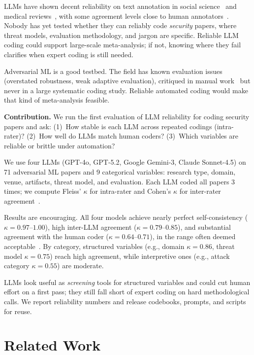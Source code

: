 \documentclass[conference,compsoc]{IEEEtran}
\begin{document}
LLMs have shown decent reliability on text annotation in social science~\cite{gilardi2023chatgpt,tornberg2024chatgpt} and medical reviews~\cite{gartlehner2025ai}, with some agreement levels close to human annotators~\cite{rathje2024gpt}. Nobody has yet tested whether they can reliably code \emph{security} papers, where threat models, evaluation methodology, and jargon are specific. Reliable LLM coding could support large-scale meta-analysis; if not, knowing where they fail clarifies when expert coding is still needed.

Adversarial ML is a good testbed. The field has known evaluation issues~\cite{carlini2017towards,athalye2018obfuscated,tramer2020adaptive,arp2022dos} (overstated robustness, weak adaptive evaluation), critiqued in manual work~\cite{carlini2019evaluating} but never in a large systematic coding study. Reliable automated coding would make that kind of meta-analysis feasible.

\textbf{Contribution.} We run the first evaluation of LLM reliability for coding security papers and ask: (1)~How stable is each LLM across repeated codings (intra-rater)? (2)~How well do LLMs match human coders? (3)~Which variables are reliable or brittle under automation?

We use four LLMs (GPT-4o, GPT-5.2, Google Gemini-3, Claude Sonnet-4.5) on 71 adversarial ML papers and 9 categorical variables: research type, domain, venue, artifacts, threat model, and evaluation. Each LLM coded all papers 3 times; we compute Fleiss' $\kappa$ for intra-rater and Cohen's $\kappa$ for inter-rater agreement~\cite{krippendorff2004reliability,neuendorf2017content}.

Results are encouraging. All four models achieve nearly perfect self-consistency ($\kappa = 0.97$--$1.00$), high inter-LLM agreement ($\kappa = 0.79$--$0.85$), and substantial agreement with the human coder ($\kappa = 0.64$--$0.71$), in the range often deemed acceptable~\cite{landis1977measurement}. By category, structured variables (e.g., domain $\kappa = 0.86$, threat model $\kappa = 0.75$) reach high agreement, while interpretive ones (e.g., attack category $\kappa = 0.55$) are moderate.

LLMs look useful as \emph{screening} tools for structured variables and could cut human effort on a first pass; they still fall short of expert coding on hard methodological calls. We report reliability numbers and release codebooks, prompts, and scripts for reuse.

\section{Related Work}
\end{document}
